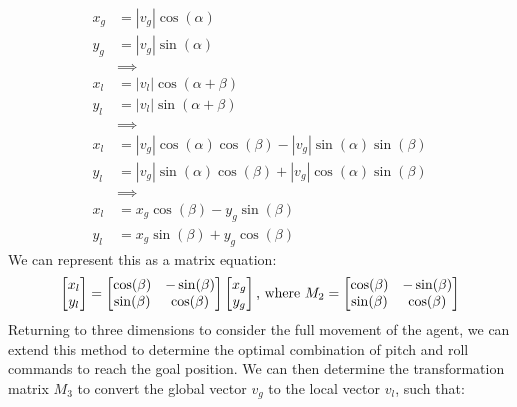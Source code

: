 \documentclass[12pt]{article}
\begin{document}
\begin{equation}
    \begin{aligned}
        x_g &= |v_g| \cos(\alpha) \\
        y_g &= |v_g| \sin(\alpha) \\
            &\implies \\
        x_l &= |v_l| \cos(\alpha + \beta) \\
        y_l &= |v_l| \sin(\alpha + \beta) \\
            &\implies \\
        x_l &= |v_g| \cos(\alpha)\cos(\beta) - |v_g| \sin(\alpha)\sin(\beta) \\
        y_l &= |v_g| \sin(\alpha)\cos(\beta) + |v_g| \cos(\alpha)\sin(\beta) \\
            &\implies \\
        x_l &= x_g \cos(\beta) - y_g \sin(\beta) \\
        y_l &= x_g \sin(\beta) + y_g \cos(\beta)
    \end{aligned}
\end{equation}
We can represent this as a matrix equation:
\begin{equation}
    \begin{bmatrix}
    x_l \\
    y_l
    \end{bmatrix}
    = 
    \begin{bmatrix}
    \cos(\beta) & -\sin(\beta) \\
    \sin(\beta) & \cos(\beta)
    \end{bmatrix}
    \begin{bmatrix}
    x_g \\
    y_g
    \end{bmatrix}
    \\ \text{, where } \\
    M_2 = 
    \begin{bmatrix}
    \cos(\beta) & -\sin(\beta) \\
    \sin(\beta) & \cos(\beta)
    \end{bmatrix}
\end{equation}
Returning to three dimensions to consider the full movement of the agent, we can extend this method to determine the optimal combination of pitch and roll commands to reach the goal position. We can then determine the transformation matrix $M_3$ to convert the global vector $v_g$ to the local vector $v_l$, such that:
\end{document}
